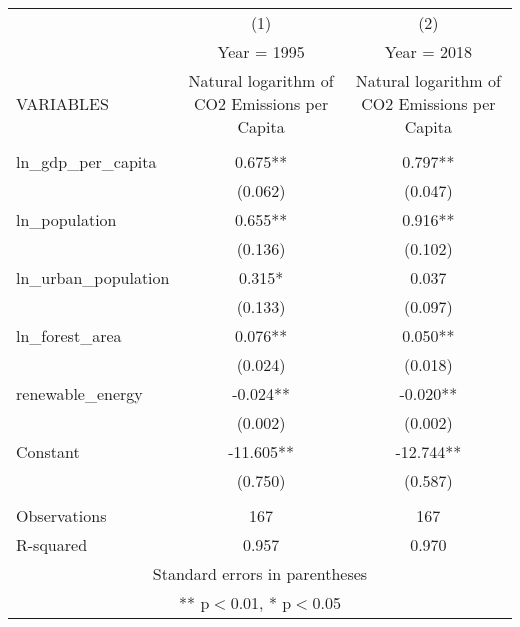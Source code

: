 \begin{tabular}{lcc} \hline
 & (1) & (2) \\
 & Year = 1995 & Year = 2018 \\
VARIABLES & Natural logarithm of CO2 Emissions per Capita & Natural logarithm of CO2 Emissions per Capita \\ \hline
 &  &  \\
ln\_gdp\_per\_capita & 0.675** & 0.797** \\
 & (0.062) & (0.047) \\
ln\_population & 0.655** & 0.916** \\
 & (0.136) & (0.102) \\
ln\_urban\_population & 0.315* & 0.037 \\
 & (0.133) & (0.097) \\
ln\_forest\_area & 0.076** & 0.050** \\
 & (0.024) & (0.018) \\
renewable\_energy & -0.024** & -0.020** \\
 & (0.002) & (0.002) \\
Constant & -11.605** & -12.744** \\
 & (0.750) & (0.587) \\
 &  &  \\
Observations & 167 & 167 \\
 R-squared & 0.957 & 0.970 \\ \hline
\multicolumn{3}{c}{ Standard errors in parentheses} \\
\multicolumn{3}{c}{ ** p$<$0.01, * p$<$0.05} \\
\end{tabular}
